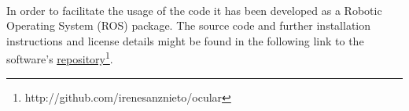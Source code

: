 

\\

In order to facilitate the usage of the code it has been developed as a Robotic Operating System (ROS) \cite{ros} package. The source code and further installation instructions and license details might be found in the following link to the software's \href{http://github.com/irenesanznieto/ocular}{\color{blue}\underline {repository}}\footnote{http://github.com/irenesanznieto/ocular}. 
